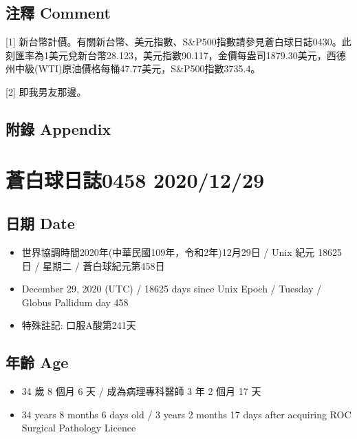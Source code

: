 \documentclass[
]{article}
\providecommand{\tightlist}{%
  \setlength{\itemsep}{0pt}\setlength{\parskip}{0pt}}
\begin{document}
\hypertarget{ux6ce8ux91cb-comment-27}{%
\subsection{注釋 Comment}\label{ux6ce8ux91cb-comment-27}}

{[}1{]}
新台幣計價。有關新台幣、美元指數、S\&P500指數請參見蒼白球日誌0430。此刻匯率為1美元兌新台幣28.123，美元指數90.117，金價每盎司1879.30美元，西德州中級(WTI)原油價格每桶47.77美元，S\&P500指數3735.4。

{[}2{]} 即我男友那邊。

\hypertarget{ux9644ux9304-appendix-27}{%
\subsection{附錄 Appendix}\label{ux9644ux9304-appendix-27}}

\hypertarget{ux84bcux767dux7403ux65e5ux8a8c0458-20201229}{%
\section{蒼白球日誌0458
2020/12/29}\label{ux84bcux767dux7403ux65e5ux8a8c0458-20201229}}

\hypertarget{ux65e5ux671f-date-28}{%
\subsection{日期 Date}\label{ux65e5ux671f-date-28}}

\begin{itemize}
\tightlist
\item
  世界協調時間2020年(中華民國109年，令和2年)12月29日 / Unix 紀元 18625
  日 / 星期二 / 蒼白球紀元第458日
\item
  December 29, 2020 (UTC) / 18625 days since Unix Epoch / Tuesday /
  Globus Pallidum day 458
\item
  特殊註記: 口服A酸第241天
\end{itemize}

\hypertarget{ux5e74ux9f61-age-28}{%
\subsection{年齡 Age}\label{ux5e74ux9f61-age-28}}

\begin{itemize}
\tightlist
\item
  34 歲 8 個月 6 天 / 成為病理專科醫師 3 年 2 個月 17 天
\item
  34 years 8 months 6 days old / 3 years 2 months 17 days after
  acquiring ROC Surgical Pathology Licence
\end{itemize}
\end{document}
